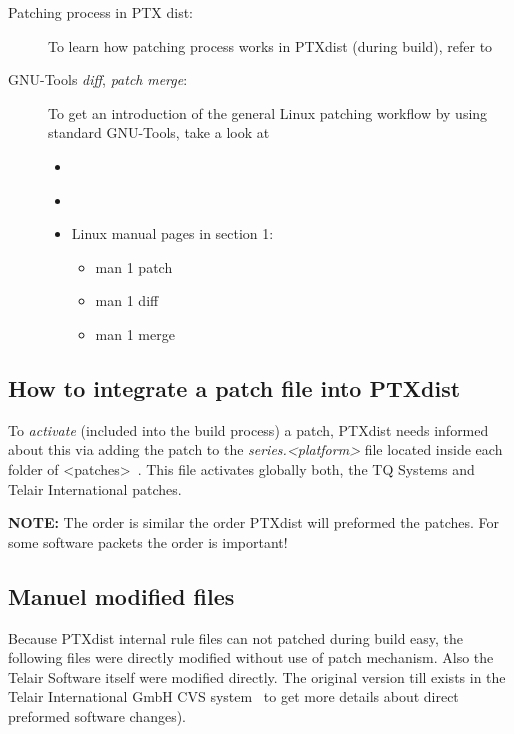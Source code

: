 \begin{description}
    \item[Patching process in PTX dist:]
        To learn how patching process works in PTXdist (during build), refer
        to~\cite{ptxdist_manual}
    \item[GNU-Tools \textit{diff},  \textit{patch} \textit{merge}:] To get an
        introduction of the general Linux patching workflow by using
        standard GNU-Tools, take a look at
        \begin{itemize}
            \item~\cite[GNU Diff and Patch]{GNGNUUpatchDiff}
            \item~\cite[GNU Merge]{GNUmerge}
            \item Linux manual pages in section 1:
                \begin{itemize}
                    \item man 1 patch
                    \item man 1 diff
                    \item man 1 merge
                \end{itemize}
        \end{itemize}
\end{description}


\subsection{How to integrate a patch file into PTXdist}%
\label{sec:integrate_patch}
To \textit{activate} (included into the build process) a patch, PTXdist needs
informed about this via adding the patch to the \textit{series.<platform>}
file located inside each folder of <patches>~\footnotemark[3]. This file
activates globally both, the TQ Systems and Telair International patches.

\textbf{NOTE:} The order is similar the order PTXdist
will preformed the patches. For some software packets the order is important!



\subsection{Manuel modified files}%
\label{sec:manuel_modified_files}

Because PTXdist internal rule files can not patched during build easy, the
following files were directly modified without use of patch mechanism. Also the
Telair Software itself were modified directly. The original version till exists
in the Telair International GmbH \gls{CVS} system~ \footnotemark[5] to get more
details about direct preformed software changes).

